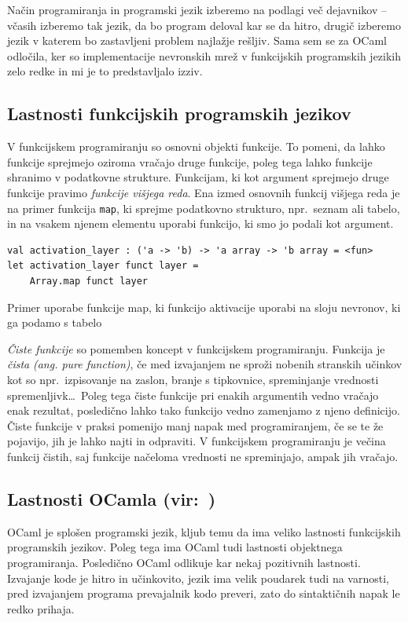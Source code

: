 \documentclass[mat1]{fmfdelo}
\begin{document}
Način programiranja in programski jezik izberemo na podlagi več dejavnikov -- včasih izberemo tak jezik, da bo program deloval kar se da hitro, drugič izberemo jezik v katerem bo zastavljeni problem najlažje rešljiv.
Sama sem se za OCaml odločila, ker so implementacije nevronskih mrež v funkcijskih programskih jezikih zelo redke in mi je to predstavljalo izziv. 
%
\subsection{Lastnosti funkcijskih programskih jezikov}
V funkcijskem programiranju so osnovni objekti funkcije. To pomeni, da lahko funkcije sprejmejo oziroma vračajo druge funkcije, poleg tega lahko funkcije shranimo v podatkovne strukture. Funkcijam, ki kot argument sprejmejo druge funkcije pravimo \emph{funkcije višjega reda}. Ena izmed osnovnih funkcij višjega reda je na primer funkcija \texttt{map}, ki sprejme podatkovno strukturo, npr.\ seznam ali tabelo, in na vsakem njenem elementu uporabi funkcijo, ki smo jo podali kot argument.
%
\begin{listing}[!h]
\begin{verbatim}
val activation_layer : ('a -> 'b) -> 'a array -> 'b array = <fun>
let activation_layer funct layer =
	Array.map funct layer
\end{verbatim} 
\caption{Primer uporabe funkcije map, ki funkcijo aktivacije uporabi na sloju nevronov, ki ga podamo s tabelo}
\label{algoritem}
\end{listing}

\emph{Čiste funkcije} so pomemben koncept v funkcijskem programiranju. Funkcija je \emph{čista} \emph{(ang. pure function)}, če med izvajanjem ne sproži nobenih stranskih učinkov kot so npr.\ izpisovanje na zaslon, branje s tipkovnice, spreminjanje vrednosti spremenljivk\ldots\ Poleg tega čiste funkcije pri enakih argumentih vedno vračajo enak rezultat, posledično lahko tako funkcijo vedno zamenjamo z njeno definicijo.  Čiste funkcije v praksi pomenijo manj napak med programiranjem, če se te že pojavijo, jih je lahko najti in odpraviti. V funkcijskem programiranju je večina funkcij čistih, saj funkcije načeloma vrednosti ne spreminjajo, ampak jih vračajo. 
\subsection{Lastnosti OCamla (vir:~\cite{Ocaml})}
OCaml je splošen programski jezik, kljub temu da ima veliko lastnosti funkcijskih programskih jezikov. Poleg tega ima OCaml tudi lastnosti objektnega programiranja. 
Posledično OCaml odlikuje kar nekaj pozitivnih lastnosti. Izvajanje kode je hitro in učinkovito, jezik ima velik poudarek tudi na varnosti, pred izvajanjem programa prevajalnik kodo preveri, zato do sintaktičnih napak le redko prihaja.
\end{document}
